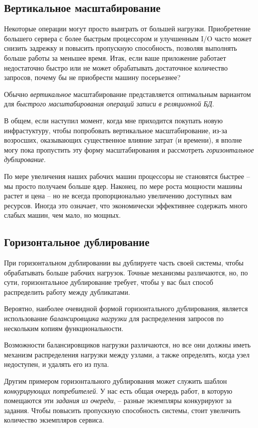 \documentclass[%
	11pt,
	a4paper,
	utf8,
		]{article}
\begin{document}
\subsection{Вертикальное масштабирование}

Некоторые операции могут просто выиграть от большей нагрузки. Приобретение большего сервера с более быстрым процессором и улучшенным I/O часто может снизить задрежку и повысить пропускную способность, позволяя выполнять больше работы за меньшее время. Итак, если ваше приложение работает недостаточно быстро или не может обрабатывать достаточное количество запросов, почему бы не приобрести машину посерьезнее?

Обычно \emph{вертикальное} масштабирование представляется оптимальным вариантом для \emph{быстрого масштабирования операций записи в реляционной БД}.

В общем, если наступил момент, когда мне приходится покупать новую инфрастуктуру, чтобы попробовать вертикальное масштабирование, из-за возросших, оказывающих существенное влияние затрат (и времени), я вполне могу пока пропустить эту форму масштабирования и рассмотреть \emph{горизонтальное дублирование}.

По мере увеличения наших рабочих машин процессоры не становятся быстрее -- мы просто получаем больше ядер. Наконец, по мере роста мощности машины растет и цена -- но не всегда пропорционально увеличению доступных вам ресурсов. Иногда это означает, что экономически эффективнее содержать много слабых машин, чем мало, но мощных.

\subsection{Горизонтальное дублирование}

При горизонтальном дублировании вы дублируете часть своей системы, чтобы обрабатывать больше рабочих нагрузок. Точные механизмы различаются, но, по сути, горизонтальное дублирование требует, чтобы у вас был способ распределить работу между дубликатами.

Вероятно, наиболее очевидной формой горизонтального дублирования, является использование \emph{балансировщика нагрузки} для распределения запросов по нескольким копиям функциональности.

Возможности балансировщиков нагрузки различаются, но все они должны иметь механизм распределения нагрузки между узлами, а также определять, когда узел недоступен, и удалять его из пула.

Другим примером горизонтального дублирования может служить шаблон \emph{конкурирующих потребителей}. У нас есть общая очередь работ, в которую помещаются эти \emph{задания из очереди}, -- разные экземпляры конкурируют за задания. Чтобы повысить пропускную способность системы, стоит увеличить количество экземпляров сервиса.
\end{document}
